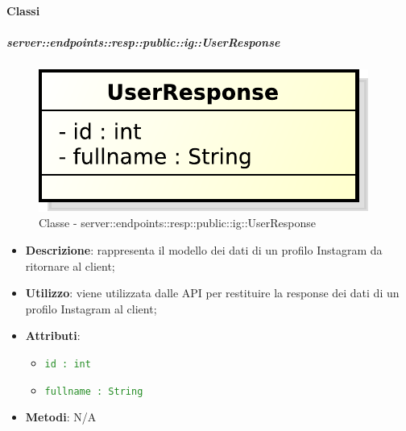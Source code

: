   \paragraph{Classi} %

    \subparagraph{server::endpoints::resp::public::ig::UserResponse} %
    \label{subp:bdsm_app_server_endpoints_resp_public_ig_userresponse}
  \begin{figure}[!htbp]
    \centering
    \centerline{\includegraphics[scale=0.6]{./images/server/classes/endpoints/ig/user_response.pdf}}
    \caption{Classe - server::endpoints::resp::public::ig::UserResponse}
  \end{figure}
    \begin{itemize}
      \item \textbf{Descrizione}: rappresenta il modello dei dati di un profilo Instagram da ritornare al client;
      \item \textbf{Utilizzo}: viene utilizzata dalle API per restituire la response dei dati di un profilo Instagram al client;

    \item \textbf{Attributi}:
      \begin{itemize}
        \item \textcolor{forestgreen}{\texttt{id : int}}
        \item \textcolor{forestgreen}{\texttt{fullname : String}}
      \end{itemize}
    \item \textbf{Metodi}: N/A
      \end{itemize}

